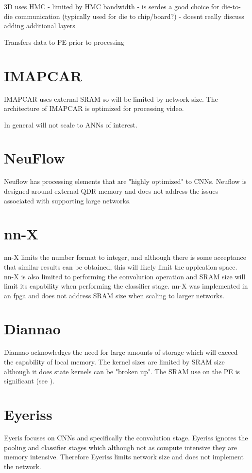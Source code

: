 {{{3D uses HMC
 - limited by HMC bandwidth
 - is serdes a good choice for die-to-die communication (typically used for die to chip/board?)
 - doesnt really discuss adding additional layers

Transfers data to PE prior to processing


\section[IMAPCAR]{IMAPCAR \cite{kyo2011imapcar}}
IMAPCAR uses external SRAM so will be limited by network size.
The architecture of IMAPCAR is optimized for processing video.

In general will not scale to ANNs of interest.


\section{NeuFlow \cite{farabet2011neuflow}}
Neuflow\cite{farabet2011neuflow} has processing elements that are "highly optimized" to CNNs.
Neuflow is designed around external QDR memory and does not address the issues associated with supporting large networks.


\section[nn-X]{nn-X \cite{gokhale2014240}}
nn-X\cite{gokhale2014240} limits the number format to integer, and although there is some acceptance that similar
results can be obtained, this will likely limit the applcation space. nn-X is also limited to performing the convolution operation
and SRAM size will limit its capability when performing the classifier stage.
nn-X was implemented in an fpga and does not address SRAM size when scaling to larger networks.


\section[Diannao]{Diannao \cite{chen2014diannao}}
Diannao\cite{chen2014diannao} acknowledges the need for large amounts of storage which will exceed the capability of local memory.
The kernel sizes are limited by SRAM size although it does state kernels can be "broken up".
The SRAM use on the PE is significant (see ).


\section[Eyeriss]{Eyeriss \cite{chen201614}}
Eyeris\cite{chen201614} focuses on CNNs and specifically the convolution stage.
Eyeriss ignores the pooling and classifier stages which although not as compute intensive they are memory intensive.
Therefore Eyeriss limits network size and does not implement the network.

}}}
